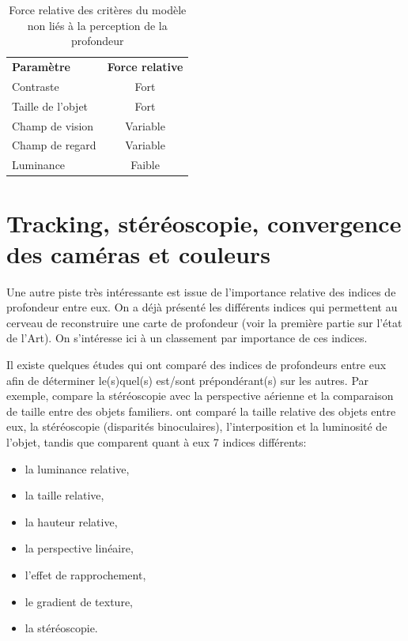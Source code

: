 \begin{table}[h]	
	\centering
	\caption{Force relative des critères du modèle non liés à la perception de la profondeur}
	\label{tab:ponderation_non_profondeur}
	\small
	\begin{tabular}{lc}
		\multicolumn{1}{l}{\bfseries Paramètre} & \multicolumn{1}{c}{\bfseries Force relative}\\		
		Contraste & Fort\\
		Taille de l'objet & Fort\\
		Champ de vision & Variable\\
		Champ de regard & Variable\\
		Luminance & Faible\\
	\end{tabular}
\end{table}

\section{Tracking, stéréoscopie, convergence des caméras et couleurs}
\par Une autre piste très intéressante est issue de l'importance relative des indices de profondeur entre eux. On a déjà présenté les différents indices qui permettent au cerveau de reconstruire une carte de profondeur (voir la première partie sur l'état de l'Art). On s'intéresse ici à un classement par importance de ces indices.

\par Il existe quelques études qui ont comparé des indices de profondeurs entre eux afin de déterminer le(s)quel(s) est/sont prépondérant(s) sur les autres. Par exemple, \citep{mazur_relative_1990} compare la stéréoscopie avec la perspective aérienne et la comparaison de taille entre des objets familiers. \citep{reinhart_comparison_1990} ont comparé la taille relative des objets entre eux, la stéréoscopie (disparités binoculaires), l'interposition et la luminosité de l'objet, tandis que \citep{surdick_relevant_1994, surdick_perception_1997} comparent quant à eux 7 indices différents:

\begin{itemize}
	\item la luminance relative,
	\item la taille relative,
	\item la hauteur relative,
	\item la perspective linéaire,
	\item l'effet de rapprochement,
	\item le gradient de texture,
	\item la stéréoscopie.
\end{itemize}


